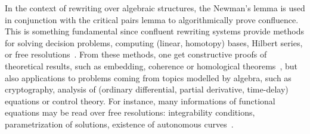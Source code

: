 \documentclass[11pt]{article}
\theoremstyle{definition}
\begin{document}
In the context of rewriting over algebraic structures, the Newman's lemma
is used in conjunction with the critical pairs lemma to algorithmically
prove confluence. This is something fundamental since confluent rewriting
systems provide methods for solving decision problems, computing (linear,
homotopy) bases, Hilbert series, or free
resolutions~\cite{MR846601, GuiraudHoffbeckMalbos19, MR2964639,
  MR1072284, MR1360005}. From these methods, one get constructive proofs
of theoretical results, such as  embedding, coherence or homological
theorems~\cite{MR506890, MR0506423, MR3347996, MR3742562, MR265437,
  MR920522}, but also applications to problems coming from topics
modelled by algebra, such as cryptography, analysis of (ordinary
differential, partial derivative, time-delay) equations or control
theory. For instance, many informations of functional equations may be
read over free resolutions: integrability conditions, parametrization of
solutions, existence of autonomous curves~\cite{MR2233761, MR1308976}.
\medskip
\end{document}
